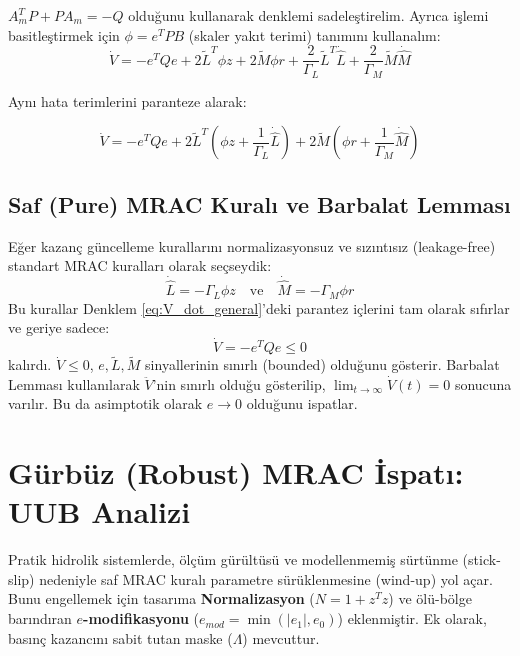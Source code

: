 \documentclass[12pt,a4paper]{article}
\begin{document}
$A_m^T P + P A_m = -Q$ olduğunu kullanarak denklemi sadeleştirelim. Ayrıca işlemi basitleştirmek için $\phi = e^T P B$ (skaler yakıt terimi) tanımını kullanalım:
\begin{equation}
    \dot{V} = -e^T Q e + 2 \tilde{L}^T \phi z + 2 \tilde{M} \phi r + \frac{2}{\Gamma_L} \tilde{L}^T \dot{\hat{L}} + \frac{2}{\Gamma_M} \tilde{M} \dot{\hat{M}}
\end{equation}

Aynı hata terimlerini paranteze alarak:
\begin{mdframed}[backgroundcolor=gray!10, linecolor=black, roundcorner=5pt]
\begin{equation}
    \dot{V} = -e^T Q e + 2 \tilde{L}^T \left( \phi z + \frac{1}{\Gamma_L} \dot{\hat{L}} \right) + 2 \tilde{M} \left( \phi r + \frac{1}{\Gamma_M} \dot{\hat{M}} \right)
    \label{eq:V_dot_general}
\end{equation}
\end{mdframed}

\subsection{Saf (Pure) MRAC Kuralı ve Barbalat Lemması}
Eğer kazanç güncelleme kurallarını normalizasyonsuz ve sızıntısız (leakage-free) standart MRAC kuralları olarak seçseydik:
\begin{equation}
    \dot{\hat{L}} = -\Gamma_L \phi z \quad \text{ve} \quad \dot{\hat{M}} = -\Gamma_M \phi r
\end{equation}
Bu kurallar Denklem \ref{eq:V_dot_general}'deki parantez içlerini tam olarak sıfırlar ve geriye sadece:
\begin{equation}
    \dot{V} = -e^T Q e \leq 0
\end{equation}
kalırdı. $\dot{V} \le 0$, $e, \tilde{L}, \tilde{M}$ sinyallerinin sınırlı (bounded) olduğunu gösterir. Barbalat Lemması kullanılarak $\ddot{V}$'nin sınırlı olduğu gösterilip, $\lim_{t \to \infty} \dot{V}(t) = 0$ sonucuna varılır. Bu da asimptotik olarak $e \to 0$ olduğunu ispatlar.

\section{Gürbüz (Robust) MRAC İspatı: UUB Analizi}

Pratik hidrolik sistemlerde, ölçüm gürültüsü ve modellenmemiş sürtünme (stick-slip) nedeniyle saf MRAC kuralı parametre sürüklenmesine (wind-up) yol açar. Bunu engellemek için tasarıma \textbf{Normalizasyon} ($N = 1+z^T z$) ve ölü-bölge barındıran \textbf{$e$-modifikasyonu} ($e_{mod} = \min(|e_1|, e_0)$) eklenmiştir. Ek olarak, basınç kazancını sabit tutan maske ($\Lambda$) mevcuttur. 
\end{document}
